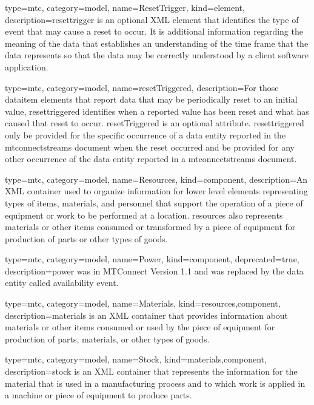 {
  type=mtc,
  category=model,
  name={ResetTrigger},
  kind={element},
  description={\gls{resettrigger} is an optional XML element that identifies the type of event that may cause a reset to occur. It is additional information regarding the meaning of the data that establishes an understanding of the time frame that the data represents so that the data may be correctly understood by a client software application.}
}


{
  type=mtc,
  category=model,
  name={resetTriggered},
  description={For those \gls{dataitem} elements that report data that may be periodically reset to an initial value, \gls{resettriggered} identifies when a reported value has been reset and what has caused that reset to occur.  \newline resetTriggered is an optional attribute.  \newline \gls{resettriggered} \MUST only be provided for the specific occurrence of a \gls{data entity} reported in the \gls{mtconnectstreams} document when the reset occurred and \MUSTNOT be provided for any other occurrence of the \gls{data entity} reported in a \gls{mtconnectstreams} document.}
}


{
  type=mtc,
  category=model,
  name={Resources},
  kind={component},
  description={An XML container used to organize information for \gls{lower level} elements representing types of items, materials, and personnel that support the operation of a piece of equipment or work to be performed at a location. \gls{resources} also represents materials or other items consumed or transformed by a piece of equipment for production of parts or other types of goods.}
}


{
  type=mtc,
  category=model,
  name={Power},
  kind={component},
  deprecated={true},
  description={\gls{power} was \DEPRECATED in MTConnect Version 1.1 and was replaced by the \gls{data entity} called \gls{availability event}.}
}


{
  type=mtc,
  category=model,
  name={Materials},
  kind={resources,component},
  description={\gls{materials} is an XML container that provides information about materials or other items consumed or used by the piece of equipment for production of parts, materials, or other types of goods.}
}


{
  type=mtc,
  category=model,
  name={Stock},
  kind={materials,component},
  description={\gls{stock} is an XML container that represents the information for the material that is used in a manufacturing process and to which work is applied in a machine or piece of equipment to produce parts.}
}


